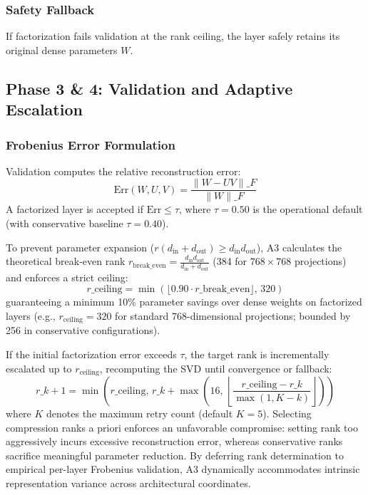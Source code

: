 \subsubsection{Safety Fallback}

If factorization fails validation at the rank ceiling, the layer safely retains its original dense parameters $W$.

\subsection{Phase 3 \& 4: Validation and Adaptive Escalation}
\label{sec:frobenius_validation}

\subsubsection{Frobenius Error Formulation}

Validation computes the relative reconstruction error:
\[
\mathrm{Err}(W, U, V) = \frac{\|W - U V\|\_F}{\|W\|\_F}
\tag{4.10}
\]
A factorized layer is accepted if $\mathrm{Err} \le \tau$, where $\tau = 0.50$ is the operational default (with conservative baseline $\tau = 0.40$).

To prevent parameter expansion ($r(d_{\mathrm{in}} + d_{\mathrm{out}}) \ge d_{\mathrm{in}} d_{\mathrm{out}}$), A3 calculates the theoretical break-even rank $r_{\mathrm{break\_even}} = \frac{d_{\mathrm{in}} d_{\mathrm{out}}}{d_{\mathrm{in}} + d_{\mathrm{out}}}$ (384 for $768 \times 768$ projections) and enforces a strict ceiling:
\[
r\_{\mathrm{ceiling}} = \min\!\left(\lfloor 0.90 \cdot r\_{\mathrm{break\_even}} \rfloor,\, 320\right)
\tag{4.10a}
\]
guaranteeing a minimum 10\% parameter savings over dense weights on factorized layers (e.g., $r_{\mathrm{ceiling}} = 320$ for standard 768-dimensional projections; bounded by 256 in conservative configurations).

If the initial factorization error exceeds $\tau$, the target rank is incrementally escalated up to $r_{\mathrm{ceiling}}$, recomputing the SVD until convergence or fallback:
\[
r\_{k+1} = \min\!\left(r\_{\mathrm{ceiling}},\, r\_k + \max\!\left(16,\, \left\lfloor\frac{r\_{\mathrm{ceiling}} - r\_k}{\max(1, K - k)}\right\rfloor\right)\right)
\tag{4.11}
\]
where $K$ denotes the maximum retry count (default $K=5$). Selecting compression ranks a priori enforces an unfavorable compromise: setting rank too aggressively incurs excessive reconstruction error, whereas conservative ranks sacrifice meaningful parameter reduction. By deferring rank determination to empirical per-layer Frobenius validation, A3 dynamically accommodates intrinsic representation variance across architectural coordinates.

